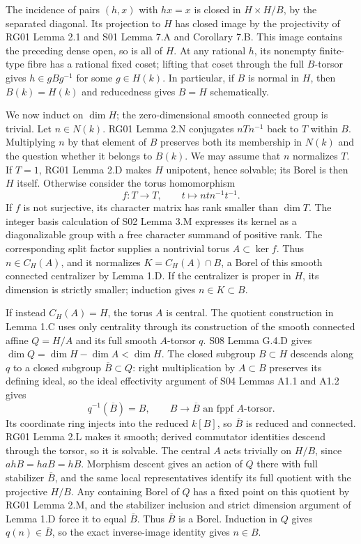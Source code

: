 \documentclass[11pt,a4paper,openany]{report}
\newcounter{none}
\begin{document}
The incidence of pairs \((h,x)\) with \(hx=x\) is closed in \(H\times H/B\), by the separated diagonal. Its projection to \(H\) has closed image by the projectivity of RG01 Lemma 2.1 and S01 Lemma 7.A and Corollary 7.B. This image contains the preceding dense open, so is all of \(H\). At any rational \(h\), its nonempty finite-type fibre has a rational fixed coset; lifting that coset through the full \(B\)-torsor gives \(h\in gBg^{-1}\) for some \(g\in H(k)\). In particular, if \(B\) is normal in \(H\), then \(B(k)=H(k)\) and reducedness gives \(B=H\) schematically.

We now induct on \(\dim H\); the zero-dimensional smooth connected group is trivial. Let \(n\in N(k)\). RG01 Lemma 2.N conjugates \(nTn^{-1}\) back to \(T\) within \(B\). Multiplying \(n\) by that element of \(B\) preserves both its membership in \(N(k)\) and the question whether it belongs to \(B(k)\). We may assume that \(n\) normalizes \(T\). If \(T=1\), RG01 Lemma 2.D makes \(H\) unipotent, hence solvable; its Borel is then \(H\) itself. Otherwise consider the torus homomorphism \[
 f:T\longrightarrow T,\qquad t\longmapsto ntn^{-1}t^{-1}.
\] If \(f\) is not surjective, its character matrix has rank smaller than \(\dim T\). The integer basis calculation of S02 Lemma 3.M expresses its kernel as a diagonalizable group with a free character summand of positive rank. The corresponding split factor supplies a nontrivial torus \(A\subset\ker f\). Thus \(n\in C_H(A)\), and it normalizes \(K=C_H(A)\cap B\), a Borel of this smooth connected centralizer by Lemma 1.D. If the centralizer is proper in \(H\), its dimension is strictly smaller; induction gives \(n\in K\subset B\).

If instead \(C_H(A)=H\), the torus \(A\) is central. The quotient construction in Lemma 1.C uses only centrality through its construction of the smooth connected affine \(Q=H/A\) and its full smooth \(A\)-torsor \(q\). S08 Lemma G.4.D gives \(\dim Q=\dim H-\dim A<\dim H\). The closed subgroup \(B\subset H\) descends along \(q\) to a closed subgroup \(\overline B\subset Q\): right multiplication by \(A\subset B\) preserves its defining ideal, so the ideal effectivity argument of S04 Lemmas A1.1 and A1.2 gives \[
 q^{-1}(\overline B)=B,
 \qquad B\longrightarrow\overline B
 \text{ an fppf }A\text{-torsor}.
\] Its coordinate ring injects into the reduced \(k[B]\), so \(\overline B\) is reduced and connected. RG01 Lemma 2.L makes it smooth; derived commutator identities descend through the torsor, so it is solvable. The central \(A\) acts trivially on \(H/B\), since \(a hB=h aB=hB\). Morphism descent gives an action of \(Q\) there with full stabilizer \(\overline B\), and the same local representatives identify its full quotient with the projective \(H/B\). Any containing Borel of \(Q\) has a fixed point on this quotient by RG01 Lemma 2.M, and the stabilizer inclusion and strict dimension argument of Lemma 1.D force it to equal \(\overline B\). Thus \(\overline B\) is a Borel. Induction in \(Q\) gives \(q(n)\in\overline B\), so the exact inverse-image identity gives \(n\in B\).
\end{document}
